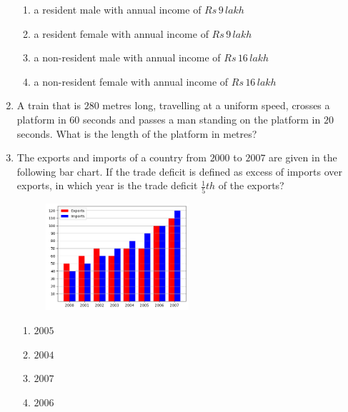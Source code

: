 \documentclass[journal]{IEEEtran}
\begin{document}
\begin{enumerate}
        \begin{enumerate}
            \item a resident male with annual income of $Rs\,9\,lakh$
            \item a resident female with annual income of $Rs\,9\,lakh$
            \item a non-resident male with annual income of $Rs\,16\,lakh$
            \item a non-resident female with annual income of $Rs\,16\,lakh$
        \end{enumerate}
    \item A train that is $280$ metres long, travelling at a uniform speed, crosses a platform in $60$ seconds and passes a man standing on the platform in $20$ seconds. What is the length of the platform in metres?
    \item The exports and imports  of a country from $2000$ to $2007$ are given in the following bar chart. If the trade deficit is defined as excess of imports over exports, in which year is the trade deficit $\frac{1}{5}th$ of the exports? 
\begin{figure}[H]
    \centering
	\includegraphics[width=0.5\textwidth]{plots/plot.png}
    \label{fig:plot}
    \end{figure}
    \begin{enumerate}
        \item $2005$
        \item $2004$
        \item $2007$
        \item $2006$
    \end{enumerate}
    

\end{enumerate}
\end{document}
